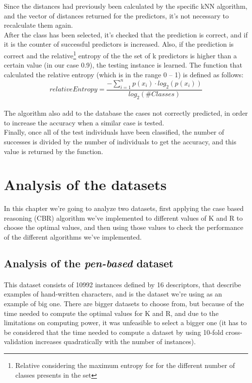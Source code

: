 \documentclass[12pt, a4paper]{article}
\begin{document}
Since the distances had previously been calculated by the specific kNN algorithm, and the vector of distances returned for the predictors, it's not necessary to recalculate them again.\\

After the class has been selected, it's checked that the prediction is correct, and if it is the counter of  successful predictors is increased. Also, if the prediction is correct and the relative\footnote{Relative considering the maximum entropy for for the different number of classes presents in the set} entropy of the the set of k predictors is higher than a certain value (in our case 0.9), the testing instance is learned. The function that calculated the relative entropy (which is in the range 0 – 1) is defined as follows:
\[
	relativeEntropy = \frac{-\sum_{i=1}^{n}{p(x_i)\cdot log_2(p(x_i))}}{log_2(\# Classes)}
\]
\paragraph{}The algorithm also add to the database the cases not correctly predicted, in order to increase the accuracy when a similar case is tested.\\

Finally, once all of the test individuals have been classified, the number of successes is divided by the number of individuals to get the accuracy, and this value is returned by the function.
\newpage
\section{Analysis of the datasets} %
\label{sec:analysis_of_the_datasets}
\paragraph{}In this chapter we're going to analyze two datasets, first applying the case based reasoning (CBR) algorithm we've implemented to different values of K and R to choose the optimal values, and then using those values to check the performance of the different algorithms we've implemented.

\subsection{Analysis of the \emph{pen-based} dataset} %
\label{sub:analysis_of_the_pen-based_dataset}
\paragraph{}This dataset consists of 10992 instances defined by 16 descriptors, that describe examples of hand-written characters, and is the dataset we're using as an example of big one. There are bigger datasets to choose from, but because of the time needed to compute the optimal values for K and R, and due to the limitations on computing power, it was unfeasible to select a bigger one (it has to be considered that the time needed to compute a dataset by using 10-fold cross-validation increases quadratically with the number of instances).\\
\end{document}
